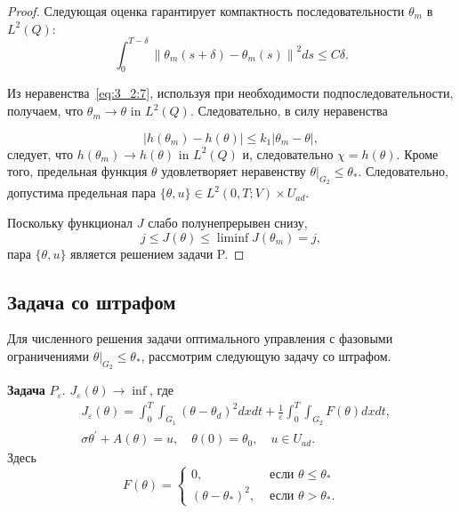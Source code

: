 \begin{proof}
    Следующая оценка гарантирует компактность последовательности $\theta_{m}$ в $L^{2}(Q)$:
    \begin{equation}
        \label{eq:3_2:7}
        \int_{0}^{T-\delta}\left\|\theta_{m}(s+\delta)-\theta_{m}(s)\right\|^{2} d s \leq C \delta.
    \end{equation}

    Из неравенства~\eqref{eq:3_2:7}, используя при необходимости подпоследовательности,
    получаем, что $\theta_{m} \rightarrow \theta$ in $L^{2}(Q)$.
    Следовательно, в силу неравенства

    \[
        \left|h\left(\theta_{m}\right)-h(\theta)\right|
        \leq k_{1}\left|\theta_{m}-\theta\right|,
    \]
    следует, что $h\left(\theta_{m}\right) \rightarrow h(\theta)$ in $L^{2}(Q)$
    и, следовательно $\chi=h(\theta)$.
    Кроме того, предельная функция $\theta$ удовлетворяет неравенству
    $\left.\theta\right|_{G_{2}} \leq \theta_{*}$.
    Следовательно, допустима предельная пара
    $\{\theta, u\} \in L^{2}(0, T ; V) \times U_{a d}$.


    Поскольку функционал $J$ слабо полунепрерывен снизу,
    \[ j \leq J(\theta) \leq \liminf J\left(\theta_{m}\right)=j, \]
    пара $\{\theta, u\}$ является решением задачи P\@.
\end{proof}

\subsection{Задача со штрафом}
\label{subsec:ch3/sec2/penalty}
Для численного решения задачи оптимального управления с фазовыми ограничениями
$\left.\theta\right|_{G_{2}} \leq \theta_{*}$, рассмотрим следующую задачу со штрафом.


\textbf{Задача} $P_{\varepsilon}$.
$J_{\varepsilon}(\theta) \rightarrow \inf$, где
\[
    \begin{aligned}
        & J_{\varepsilon}(\theta)=\int_{0}^{T}
        \int_{G_{1}}\left(\theta-\theta_{d}\right)^{2} dx dt
         +\frac{1}{\varepsilon} \int_{0}^{T}
        \int_{G_{2}} F(\theta) d x d t, \\
        & \sigma \theta^{\prime}+A(\theta)=u,
        \quad \theta(0)=\theta_{0}, \quad u \in U_{a d}.
    \end{aligned}
\]
Здесь
\[
    F(\theta)=
    \begin{cases}
        0, & \text { если } \theta \leq \theta_{*} \\
        \left(\theta-\theta_{*}\right)^{2},
        & \text { если } \theta>\theta_{*}.
    \end{cases}
\]

